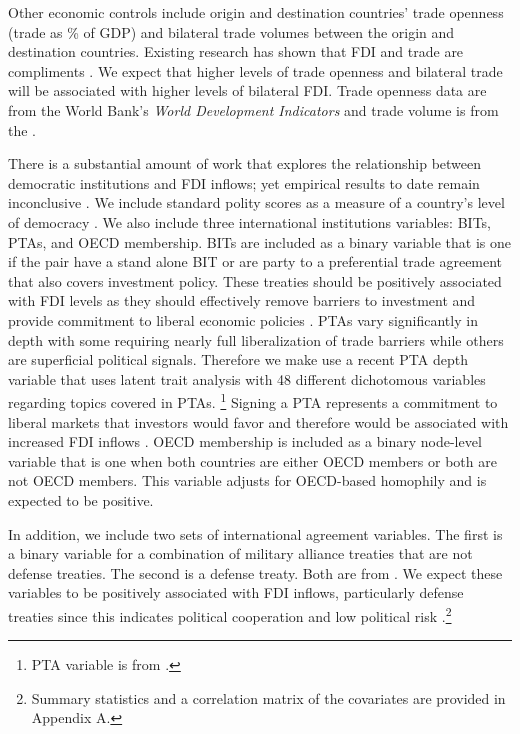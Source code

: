\documentclass[reqno,onecolumn,letterpaper,12pt]{article}
\begin{document}
Other economic controls include origin and destination countries' trade openness (trade as \% of GDP) and bilateral trade volumes between the origin and destination countries. Existing research has shown that FDI and trade are compliments \citep{aizenman2006fdi,Markusen:1995}. We expect that higher levels of trade openness and bilateral trade will be associated with higher levels of bilateral FDI. Trade openness data are from the World Bank's \textit{World Development Indicators} and trade volume is from the \citet{OECD}.

There is a substantial amount of work that explores the relationship between democratic institutions and FDI inflows; yet empirical results to date remain inconclusive \citep[see,~e.g.,][]{Jensen:2003,Li_Resnick:2003,Jakobsen_DeSoysa:2006,Li_et_al:2018,Wright_Zhu:2018,Arel-Bundock:2017b,Busse_Hefeker:2007}. We include standard polity scores as a measure of a country's level of democracy \citep{Marshall_Jaggers:2010}. We also include three international institutions variables: BITs, PTAs, and OECD membership. BITs are included as a binary variable that is one if the pair have a stand alone BIT or are party to a preferential trade agreement that also covers investment policy. These treaties should be positively associated with FDI levels as they should effectively remove barriers to investment and provide commitment to liberal economic policies \citep[e.g.,][]{Buthe_Milner:2008,Allee_Peinhardt:2011,Medvedev:2012,Osnago_et_al:2017}. PTAs vary significantly in depth with some requiring nearly full liberalization of trade barriers while others are superficial political signals. Therefore we make use a recent PTA depth variable that uses latent trait analysis with 48 different dichotomous variables regarding topics covered in PTAs. \footnote{PTA variable is from \citet{dur2014design}.} Signing a PTA represents a commitment to liberal markets that investors would favor and therefore would be associated with increased FDI inflows \citep{Buthe_Milner:2008,buthe2014foreign}. OECD membership is included as a binary node-level variable that is one when both countries are either OECD members or both are not OECD members. This variable adjusts for OECD-based homophily and is expected to be positive.


In addition, we include two sets of international agreement variables. The first is a binary variable for a combination of military alliance treaties that are not defense treaties. The second is a defense treaty. Both are from \citet{Gibler09}. We expect these variables to be positively associated with FDI inflows, particularly defense treaties since this indicates political cooperation and low political risk \citep{Li_Vashchilko:2010}.\footnote{Summary statistics and a correlation matrix of the covariates are provided in Appendix A.}
\end{document}

